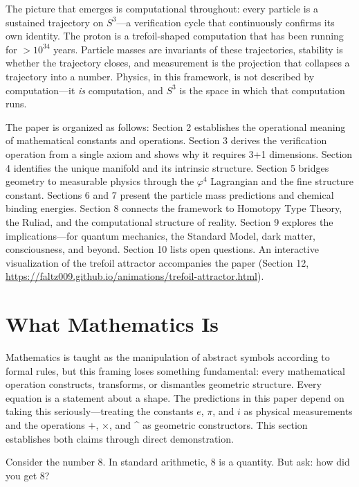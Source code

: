\documentclass[12pt]{article}
\begin{document}
The picture that emerges is computational throughout: every particle is a sustained trajectory on $S^3$---a verification cycle that continuously confirms its own identity. The proton is a trefoil-shaped computation that has been running for $>10^{34}$ years. Particle masses are invariants of these trajectories, stability is whether the trajectory closes, and measurement is the projection that collapses a trajectory into a number. Physics, in this framework, is not described by computation---it \textit{is} computation, and $S^3$ is the space in which that computation runs.

The paper is organized as follows: Section 2 establishes the operational meaning of mathematical constants and operations. Section 3 derives the verification operation from a single axiom and shows why it requires 3+1 dimensions. Section 4 identifies the unique manifold and its intrinsic structure. Section 5 bridges geometry to measurable physics through the $\varphi^4$ Lagrangian and the fine structure constant. Sections 6 and 7 present the particle mass predictions and chemical binding energies. Section 8 connects the framework to Homotopy Type Theory, the Ruliad, and the computational structure of reality. Section 9 explores the implications---for quantum mechanics, the Standard Model, dark matter, consciousness, and beyond. Section 10 lists open questions. An interactive visualization of the trefoil attractor accompanies the paper (Section 12, \url{https://faltz009.github.io/animations/trefoil-attractor.html}).


\section{What Mathematics Is}

Mathematics is taught as the manipulation of abstract symbols according to formal rules, but this framing loses something fundamental: every mathematical operation constructs, transforms, or dismantles geometric structure. Every equation is a statement about a shape. The predictions in this paper depend on taking this seriously---treating the constants $e$, $\pi$, and $i$ as physical measurements and the operations $+$, $\times$, and \^{} as geometric constructors. This section establishes both claims through direct demonstration.

Consider the number 8. In standard arithmetic, 8 is a quantity. But ask: how did you get 8?
\end{document}
